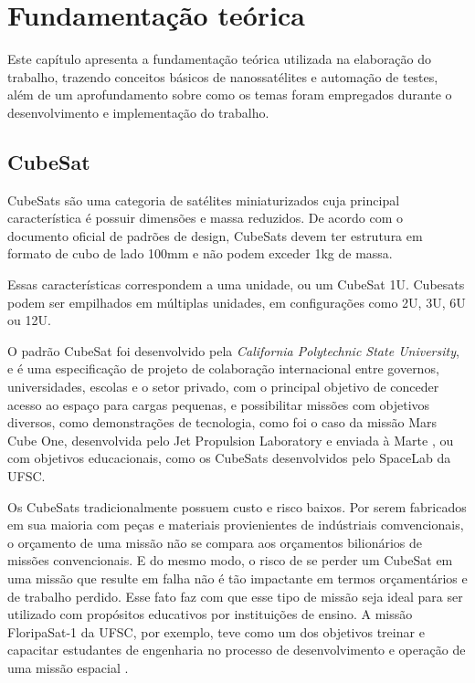 \chapter{Fundamentação teórica}

\label{section:concepts}
Este capítulo apresenta a fundamentação teórica utilizada na elaboração do trabalho, trazendo conceitos básicos de nanossatélites
e automação de testes, além de um aprofundamento sobre como os temas foram empregados durante o desenvolvimento e implementação do trabalho.

\section{CubeSat}
\label{section:cubesat}
CubeSats são uma categoria de satélites miniaturizados cuja principal característica é possuir dimensões e massa reduzidos.
De acordo com o documento oficial de padrões de design\cite{cubesat-spec}, CubeSats devem ter estrutura em formato de cubo de
lado 100mm e não podem exceder 1kg de massa.

Essas características correspondem a uma unidade, ou um CubeSat 1U. Cubesats podem ser empilhados em múltiplas unidades, em
configurações como 2U, 3U, 6U ou 12U.

O padrão CubeSat foi desenvolvido pela \textit{California Polytechnic State University}, e é uma especificação de projeto de
colaboração internacional entre governos, universidades, escolas e o setor privado, com o principal objetivo de conceder acesso
ao espaço para cargas pequenas, e possibilitar missões com objetivos diversos, como demonstrações de tecnologia, como foi o caso
da missão Mars Cube One, desenvolvida pelo Jet Propulsion Laboratory e enviada à Marte \cite{mars-cubesat}, ou com objetivos
educacionais, como os CubeSats desenvolvidos pelo SpaceLab da UFSC.

Os CubeSats tradicionalmente possuem custo e risco baixos. Por serem fabricados em sua maioria com peças e materiais provienientes
de indústriais comvencionais, o orçamento de uma missão não se compara aos orçamentos bilionários de missões convencionais.
E do mesmo modo, o risco de se perder um CubeSat em uma missão que resulte em falha não é tão impactante em termos orçamentários e
de trabalho perdido. Esse fato faz com que esse tipo de missão seja ideal para ser utilizado com propósitos educativos por instituições
de ensino. A missão FloripaSat-1 da UFSC, por exemplo, teve como um dos objetivos treinar e capacitar estudantes de engenharia no processo
de desenvolvimento e operação de uma missão espacial \cite{marcelino2020-1}.

